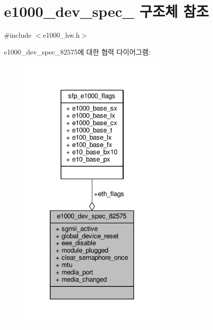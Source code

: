 \hypertarget{structe1000__dev__spec__82575}{}\section{e1000\+\_\+dev\+\_\+spec\+\_ 구조체 참조}
\label{structe1000__dev__spec__82575}


{\ttfamily \#include $<$e1000\+\_\+hw.\+h$>$}



e1000\+\_\+dev\+\_\+spec\+\_\+82575에 대한 협력 다이어그램\+:
\nopagebreak
\begin{figure}[H]
\begin{center}
\leavevmode
\includegraphics[width=206pt]{structe1000__dev__spec__82575__coll__graph}
\end{center}
\end{figure}
